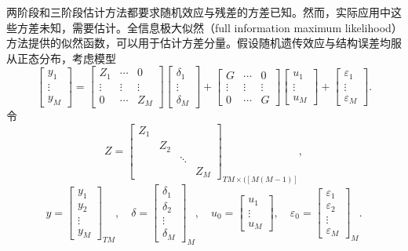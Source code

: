 两阶段和三阶段估计方法都要求随机效应与残差的方差已知。然而，实际应用中这些方差未知，需要估计。全信息极大似然（full information maximum likelihood）方法提供的似然函数，可以用于估计方差分量。假设随机遗传效应与结构误差均服从正态分布，考虑模型
\begin{equation}
\begin{bmatrix}y_1\\\vdots\\y_M\end{bmatrix}
=
\begin{bmatrix}Z_1&\cdots&0\\\vdots&\vdots&\vdots\\0&\cdots&Z_M\end{bmatrix}
\begin{bmatrix}\delta_1\\\vdots\\\delta_M\end{bmatrix}
+
\begin{bmatrix}G&\cdots&0\\\vdots&\vdots&\vdots\\0&\cdots&G\end{bmatrix}
\begin{bmatrix}u_1\\\vdots\\u_M\end{bmatrix}
+\begin{bmatrix}\varepsilon_1\\\vdots\\\varepsilon_M\end{bmatrix}.
\tag{2.38}
\end{equation}
令
\[
Z=\begin{bmatrix}Z_1&&&\\&Z_2&&\\&&\ddots&\\&&&Z_M\end{bmatrix}_{TM\times([M(M-1)]},
\]
\[
y=\begin{bmatrix}y_1\\y_2\\\vdots\\y_M\end{bmatrix}_{TM},
\quad\delta=\begin{bmatrix}\delta_1\\\delta_2\\\vdots\\\delta_M\end{bmatrix}_M,
\quad u_0=\begin{bmatrix}u_1\\\vdots\\u_M\end{bmatrix},
\quad\varepsilon_0=\begin{bmatrix}\varepsilon_1\\\varepsilon_2\\\vdots\\\varepsilon_M\end{bmatrix}_M.
\]
